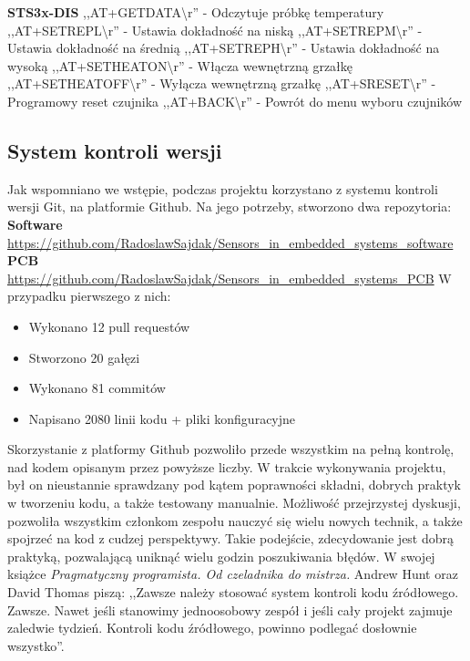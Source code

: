 \textbf{STS3x-DIS}\newline
   ,,AT+GETDATA\textbackslash r'' - Odczytuje próbkę temperatury\newline
   ,,AT+SETREPL\textbackslash r'' - Ustawia dokładność na niską \newline
   ,,AT+SETREPM\textbackslash r'' - Ustawia dokładność na średnią\newline
   ,,AT+SETREPH\textbackslash r'' - Ustawia dokładność na wysoką\newline
   ,,AT+SETHEATON\textbackslash r'' - Włącza wewnętrzną grzałkę\newline
   ,,AT+SETHEATOFF\textbackslash r'' - Wyłącza wewnętrzną grzałkę\newline
   ,,AT+SRESET\textbackslash r'' - Programowy reset czujnika\newline
   ,,AT+BACK\textbackslash r'' - Powrót do menu wyboru czujników\newline

\subsection{System kontroli wersji}
Jak wspomniano we wstępie, podczas projektu korzystano z systemu kontroli wersji Git, na platformie Github. Na jego potrzeby, stworzono dwa repozytoria:\newline
\textbf{Software}\newline
\url{https://github.com/RadoslawSajdak/Sensors_in_embedded_systems_software}\newline
\textbf{PCB}\newline
\url{https://github.com/RadoslawSajdak/Sensors_in_embedded_systems_PCB}\newline
\newline
W przypadku pierwszego z nich:
\begin{itemize}
    \item Wykonano 12 pull requestów
    \item Stworzono 20 gałęzi
    \item Wykonano 81 commitów
    \item Napisano 2080 linii kodu + pliki konfiguracyjne
\end{itemize}
Skorzystanie z platformy Github pozwoliło przede wszystkim na pełną kontrolę, nad kodem opisanym przez powyższe liczby. W trakcie wykonywania projektu, był on nieustannie sprawdzany pod kątem poprawności składni, dobrych praktyk w tworzeniu kodu, a także testowany manualnie. Możliwość przejrzystej dyskusji, pozwoliła wszystkim członkom zespołu nauczyć się wielu nowych technik, a także spojrzeć na kod z cudzej perspektywy. Takie podejście, zdecydowanie jest dobrą praktyką, pozwalającą uniknąć wielu godzin poszukiwania błędów. W swojej książce \textit{Pragmatyczny programista. Od czeladnika do mistrza.} Andrew Hunt oraz David Thomas piszą: ,,Zawsze należy stosować system kontroli kodu źródłowego. Zawsze. Nawet jeśli stanowimy jednoosobowy zespół i jeśli cały projekt zajmuje zaledwie tydzień. Kontroli kodu źródłowego, powinno podlegać dosłownie wszystko''\cite{pragmatic}.